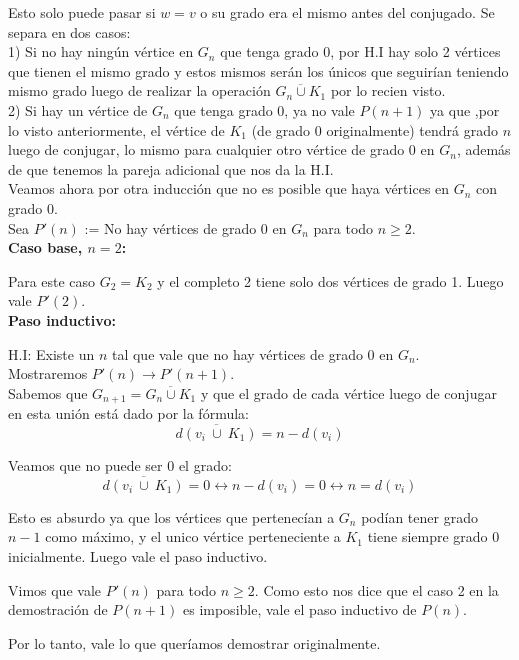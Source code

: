 \documentclass{article}
\begin{document}
Esto solo puede pasar si $w = v$ o su grado era el mismo antes del conjugado. Se separa en dos casos:\\

1) Si no hay ningún vértice en $G_n$ que tenga grado 0, por H.I hay solo 2 vértices que tienen el mismo grado y estos mismos serán los únicos que seguirían teniendo mismo grado luego de realizar la operación $\overline{G_n \cup K_1}$ por lo recien visto. \\

2) Si hay un vértice de $G_n$ que tenga grado 0, ya no vale $P(n + 1)$ ya que ,por lo visto anteriormente, el vértice de $K_1$ (de grado 0 originalmente) tendrá grado $n$ luego de conjugar, lo mismo para cualquier otro vértice de grado 0 en $G_n$, además de que tenemos la pareja adicional que nos da la H.I.\\

Veamos ahora por otra inducción que no es posible que haya vértices en $G_n$ con grado 0.\\

Sea $P'(n)$ := No hay vértices de grado 0 en $G_n$ para todo $n \geq 2$.\\

\textbf{Caso base, $n = 2$:}

Para este caso $G_2 = K_2$ y el completo 2 tiene solo dos vértices de grado 1. Luego vale $P'(2)$.\\

\textbf{Paso inductivo:}

H.I: Existe un $n$ tal que vale que no hay vértices de grado 0 en $G_n$. \\ 
Mostraremos $P'(n) \rightarrow P'(n+1)$.\\

Sabemos que $G_{n+1} = \overline{G_n \cup K_1}$ y que el grado de cada vértice luego de conjugar en esta unión está dado por la fórmula:
\[ \overline{d(v_i \ \cup\  K_1)} =  n - d(v_i) \]

Veamos que no puede ser 0 el grado:
\[ \overline{d(v_i \ \cup\  K_1)}  = 0 \leftrightarrow n - d(v_i) = 0 \leftrightarrow n = d(v_i) \]

Esto es absurdo ya que los vértices que pertenecían a $G_n$ podían tener grado $n-1$ como máximo, y el unico vértice  perteneciente a $K_1$ tiene siempre grado 0 inicialmente. Luego vale el paso inductivo.

Vimos que vale $P'(n)$ para todo $n \geq 2$. Como esto nos dice que el caso 2 en la demostración de $P(n+1)$ es imposible, vale el paso inductivo de $P(n)$.

Por lo tanto, vale lo que queríamos demostrar originalmente.
\end{document}
